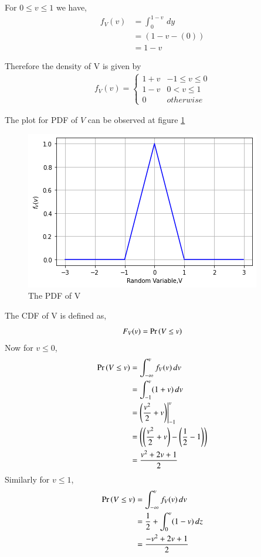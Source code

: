 \documentclass[journal,12pt,twocolumn]{IEEEtran}
\begin{document}
For $0 \le v \le 1$ we have, 
\begin{align}
    f_V(v) &=   \int_{0}^{1-v} \,dy  \\
          &= (1-v - (0)) \\
          &= 1-v
\end{align}

Therefore the density of V is given by
\begin{align}
\label{eq:pdf_v}
f_{V}(v)  = 
\begin{cases}
1+v & -1 \le v \le 0
\\
1-v & 0 < v \le 1
\\
0 & otherwise
\end{cases}
\end{align}

The plot for PDF of $V $ can be observed at figure \ref{fig:The PDF of V}
\begin{figure}[!ht]
       \centering
    \includegraphics[width=\columnwidth] {Assignment_3_Fig_1.png}
    \caption{The PDF of V}
    \label{fig:The PDF of V}
\end{figure}

The CDF of V is defined as,
\begin{equation}
    F_V(v) = \Pr\left(V \le v\right)
\end{equation}
Now for $ v \le 0 $,
 \begin{align}
    \Pr\left(V\le v\right) &=  \int_{-\infty}^{v}f_{V}(v) \,dv  \\
          &=  \int_{-1}^{v} (1+v) \,dv  \\
          &=  \left(\dfrac{v^2}{2}+v \right) \Biggr|_{-1}^{v}  \\
          &=   \left(\left(\dfrac{v^2}{2}+v \right) - \left(\dfrac{1}{2} -1 \right)\right) \\
          &= \dfrac{v^2+2v +1}{2}
\end{align}
Similarly for $v \le 1$,
\begin{align}
    \Pr\left(V\le v\right) &=  \int_{-\infty}^{v}f_{V}(v) \,dv  \\
          &=  \dfrac{1}{2} + \int_{0}^{v}(1-v)\,dz  \\
          &=  \dfrac{-v^2+2v+1}{2}
\end{align}
\end{document}

